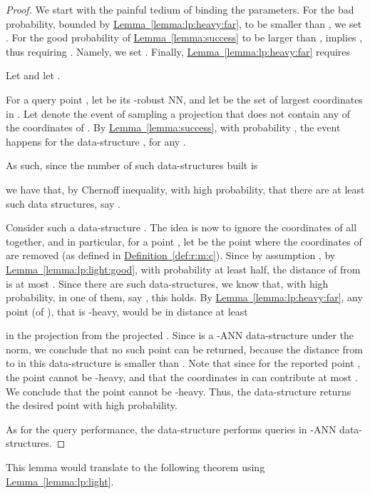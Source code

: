 \documentclass[12pt]{article}\usepackage[cm]{fullpage}
\newcommand{\Term}[1]{\textsf{#1}}
\theoremstyle{remark}\theoremheaderfont{\sf}\theorembodyfont{\upshape}\newtheorem{defn}[theorem]{Definition}
\numberwithin{figure}{section}\numberwithin{table}{section}\numberwithin{equation}{section}
\newcommand{\HLink}[2]{\hyperref[#2]{#1~\ref*{#2}}}
\newcommand{\defref}[1]{\HLink{Definition}{def:#1}}
\newcommand{\lemref}[1]{\HLink{Lemma}{lemma:#1}}
\newcommand{\ANN}{\Term{ANN}\xspace}\newcommand{\NN}{\Term{NN}\xspace}
\begin{document}
\begin{proof}
    We start with the painful tedium of binding the parameters.  For
    the bad probability, bounded by \lemref{lp:heavy:far}, to be
    smaller than , we set .  For the good
    probability  of \lemref{success} to be
    larger than , implies
    , thus requiring
    . Namely, we set
    .  Finally, \lemref{lp:heavy:far}
    requires
    
    Let  and
    let .
    
    For a query point , let  be its -robust \NN, and
    let  be the set of  largest coordinates in
    . Let  denote the event of sampling
    a projection  that does not
    contain any of the coordinates of .  By \lemref{success}, with
    probability ,
    the event  happens for the data-structure , for any
    .

    As such, since the number of such data-structures built is   
    
    we have that, by Chernoff inequality, with high probability, that
    there are at least  such data structures, say
    .


    Consider such a data-structure .  The idea is now to ignore
    the coordinates of  all together, and in particular, for a
    point , let  be the
    point where the  coordinates of  are removed (as defined in
    \defref{r:m:c}).  Since by assumption
    ,
    by \lemref{lp:light:good}, with probability at least half, the
    distance of  from  is at most
    .  Since there are
     such data-structures, we know that, with high
    probability, in one of them, say , this holds.  By
    \lemref{lp:heavy:far}, any point  (of ),
    that is -heavy, would be in distance
    at least
    
    in the projection  from the projected .  Since
     is a -\ANN data-structure under the
     norm, we conclude that no such point can be returned,
    because the distance from  to  in this
    data-structure is smaller than .
    Note that since for the reported point , the point
     cannot be
    -heavy, and that the
    coordinates in  can contribute at most
    . We conclude that
    the point  cannot be
    -heavy.  Thus, the
    data-structure returns the desired point with high probability.

    As for the query performance, the data-structure performs
     queries in -\ANN data-structures.
\end{proof}

This lemma would translate to the following theorem using
\lemref{lp:light}.
\end{document}
